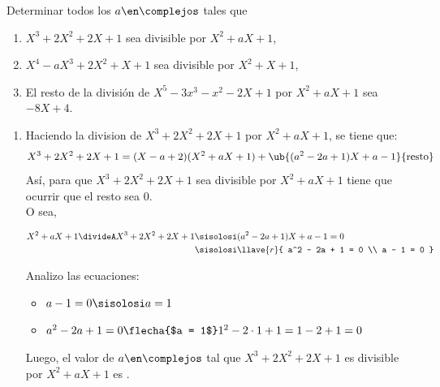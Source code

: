 \begin{enunciado}{\ejercicio}
  Determinar todos los $a \en \complejos$ tales que
  \begin{enumerate}[label=\roman*)]
    \item $X^3 + 2X^2 + 2X + 1$ sea divisible por $X^2 + aX + 1$,
    \item $X^4 - aX^3 + 2X^2 + X + 1$ sea divisible por $X^2 + X + 1$,
    \item El resto de la división de $X^5 - 3x^3 - x^2 - 2X + 1$ por $X^2 + aX + 1$ sea $-8X + 4$.
  \end{enumerate}
\end{enunciado}

\begin{enumerate}[label=\roman*)]
  \item
        Haciendo la division de $X^3 + 2X^2 + 2X + 1$ por $X^2 + aX + 1$, se tiene que:
        \[
          X^3 + 2X^2 + 2X + 1 = (X - a + 2)(X^2 + aX + 1) + \ub{(a^2 - 2a + 1)X + a - 1}{\text{resto}}
        \]
        Así, para que $X^3 + 2X^2 + 2X + 1$ sea divisible por $X^2 + aX + 1$ tiene que ocurrir que el resto sea 0.\\
        O sea,

        \begin{align*}
          X^2 + aX + 1 \divideA X^3 + 2X^2 + 2X + 1 \sisolosi & (a^2 - 2a + 1)X + a - 1 = 0 \\
          \sisolosi                                           & \llave{r}{
          a^2 - 2a + 1 = 0                                                                  \\
            a - 1 = 0
          }
        \end{align*}

        Analizo las ecuaciones:\\
        \begin{itemize}
          \item $a - 1 = 0 \sisolosi a = 1$
          \item $a^2 - 2a + 1 = 0
                  \flecha{$a = 1$}
                  1^2 - 2 \cdot 1 + 1 = 1 - 2 + 1 = 0$
        \end{itemize}

        Luego, el valor de $a \en \complejos$
        tal que $X^3 + 2X^2 + 2X + 1$ es divisible por $X^2 + aX + 1$ es .


\end{enumerate}
